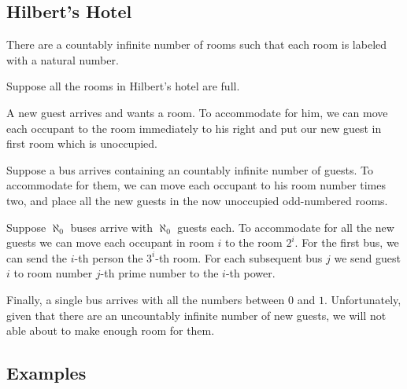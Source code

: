 \documentclass[00_complete]{subfiles}
\begin{document}
\subsection{Hilbert's Hotel}
    There are a countably infinite number of rooms such that each room is
    labeled with a natural number.

    Suppose all the rooms in Hilbert's hotel are full.

    A new guest arrives and wants a room. To accommodate for him, we can move
    each occupant to the room immediately to his right and put our new guest in
    first room which is unoccupied.

    Suppose a bus arrives containing an countably infinite number of guests. To
    accommodate for them, we can move each occupant to his room number times
    two, and place all the new guests in the now unoccupied odd-numbered rooms.

    Suppose $\aleph_0$ buses arrive with $\aleph_0$ guests each. To accommodate
    for all the new guests we can move each occupant in room $i$ to the room
    $2^i$. For the first bus, we can send the $i$-th person the $3^i$-th room.
    For each subsequent bus $j$ we send guest $i$ to room number $j$-th prime number to
    the $i$-th power.

    Finally, a single bus arrives with all the numbers between $0$ and $1$.
    Unfortunately, given that there are an uncountably infinite number of new
    guests, we will not able about to make enough room for them.
\subsection{Examples}
\end{document}
